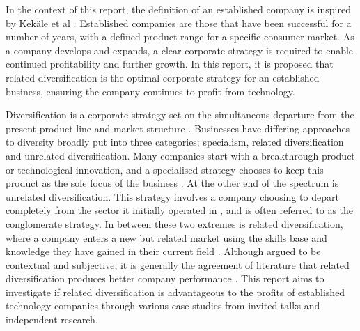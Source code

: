 

In the context of this report, the definition of an established company is inspired by Kek{\"a}le et al \cite{kekale2007successful}. 
Established companies are those that have been successful for a number of years, with a defined product range for a specific consumer market. 
As a company develops and expands, a clear corporate strategy is required to enable continued profitability and further growth.
In this report, it is proposed that related diversification is the optimal corporate strategy for an established business, ensuring the company continues to profit from technology.

Diversification is a corporate strategy set on the simultaneous departure from the present product line and market structure \cite{ansoff1957strategies}.
Businesses have differing approaches to diversity broadly put into three categories; specialism, related diversification and unrelated diversification. 
Many companies start with a breakthrough product or technological innovation, and a specialised strategy chooses to keep this product as the sole focus of the business \cite{johnson2008exploring}.
At the other end of the spectrum is unrelated diversification.
This strategy involves a company choosing to depart completely from the sector it initially operated in \cite{johnson2008exploring}, and is often referred to as the conglomerate strategy.
In between these two extremes is related diversification, where a company enters a new but related market using the skills base and knowledge they have gained in their current field \cite{johnson2008exploring}. 
Although argued to be contextual and subjective, it is generally the agreement of literature that related diversification produces better company performance \cite{johnson2008exploring, SMJ:SMJ334, SMJ:SMJ82}. 
This report aims to investigate if related diversification is advantageous to the profits of established technology companies through various case studies from invited talks and independent research.


